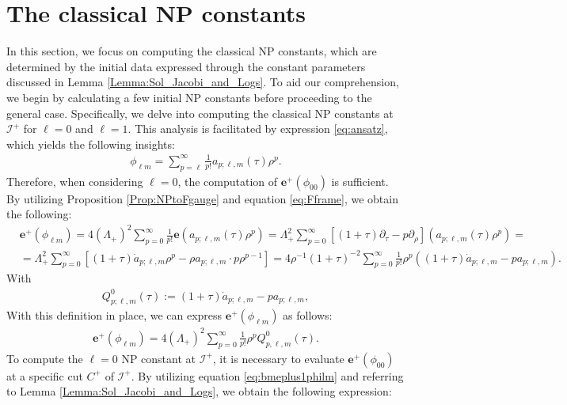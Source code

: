 \section{The classical NP constants}
\label{sec:classicalNP}

In this section, we focus on computing the classical NP constants, which are determined by the initial data expressed through the constant parameters discussed in Lemma \ref{Lemma:Sol_Jacobi_and_Logs}. To aid our comprehension, we begin by calculating a few initial NP constants before proceeding to the general case. Specifically, we delve into computing the classical NP constants at $\mathscr{I}^{+}$ for $\ell=0$ and $\ell=1$. This analysis is facilitated by expression \eqref{eq:ansatz}, which yields the following insights:
\begin{align}\label{eq:exp_phi_lm}
  \phi_{\ell m}= \sum_{p=\ell}^{\infty}\frac{1}{p!}a_{p;\ell,m}(\tau)\rho^{p}.
\end{align}
Therefore, when considering $\ell=0$, the computation of $\boldsymbol{e}^{+}(\phi_{00})$ is sufficient. By utilizing Proposition \ref{Prop:NPtoFgauge} and equation \eqref{eq:Fframe}, we obtain the following:
\begin{align}\label{eq:bmeplus1philmraw}
   & \boldsymbol{e}^{+}(\phi_{\ell m})= 4(\Lambda_{+})^{2}\sum_{p=0}^{\infty}\frac{1}{p!}\boldsymbol{e}(a_{p;\ell,m}(\tau)\rho^{p}) = \Lambda_{+}^{2} \sum_{p=0}^{\infty} \left[(1+\tau) \partial_{\tau}-p \partial_{\rho}\right]\left(a_{p ; \ell, m}(\tau) \rho^{p}\right)= \nonumber \\
   & =\Lambda_{+}^{2} \sum_{p=0}^{\infty} \left[(1+\tau) \dot{a}_{p; \ell, m} \rho^{p}-\rho a_{p ; \ell, m} \cdot p \rho^{p-1}\right] = 4 \rho^{-1}(1+\tau)^{-2}\sum_{p=0}^{\infty} \frac{1}{p!}\rho^p((1+\tau)\dot{a}_{p;\ell,m}-p a_{p;\ell,m}).
\end{align}
With
\begin{align}\label{eq:defQ0}
  Q^{0}_{p;\ell,m}(\tau):=(1+\tau)\dot{a}_{p;\ell,m}-p a_{p;\ell,m},
\end{align}
With this definition in place, we can express $\boldsymbol{e}^{+}(\phi_{\ell m})$ as follows:
\begin{align}\label{eq:bmeplus1philm}
  \boldsymbol{e}^{+}(\phi_{\ell m}) = 4 (\Lambda_{+})^{2}\sum_{p=0}^{\infty} \frac{1}{p!}\rho^{p}Q^{0}_{p,\ell,m}(\tau).
\end{align}
To compute the $\ell=0$ NP constant at $\mathscr{I}^{+}$, it is necessary to evaluate $\boldsymbol{e}^{+}(\phi_{00})$ at a specific cut ${C}^{+}$ of $\mathscr{I}^{+}$. By utilizing equation \eqref{eq:bmeplus1philm} and referring to Lemma \ref{Lemma:Sol_Jacobi_and_Logs}, we obtain the following expression:
